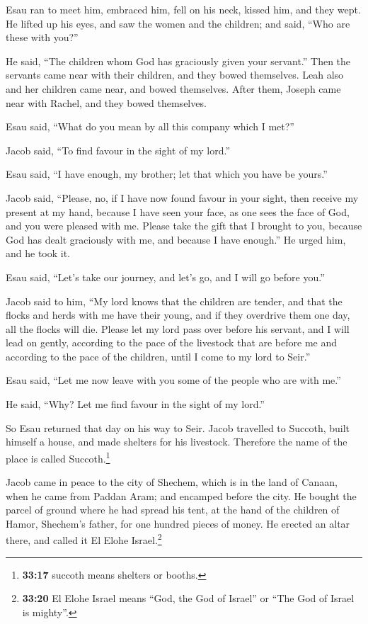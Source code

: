  Esau ran to meet him, embraced him, fell on his neck,
kissed him, and they wept.  He lifted up his eyes, and saw
the women and the children; and said, ``Who are these with you?''

He said, ``The children whom God has graciously given your servant.''
 Then the servants came near with their children, and they
bowed themselves.  Leah also and her children came near,
and bowed themselves. After them, Joseph came near with Rachel, and they
bowed themselves.

 Esau said, ``What do you mean by all this company which I
met?''

Jacob said, ``To find favour in the sight of my lord.''

 Esau said, ``I have enough, my brother; let that which
you have be yours.''

 Jacob said, ``Please, no, if I have now found favour in
your sight, then receive my present at my hand, because I have seen your
face, as one sees the face of God, and you were pleased with me.
 Please take the gift that I brought to you, because God
has dealt graciously with me, and because I have enough.'' He urged him,
and he took it.

 Esau said, ``Let's take our journey, and let's go, and I
will go before you.''

 Jacob said to him, ``My lord knows that the children are
tender, and that the flocks and herds with me have their young, and if
they overdrive them one day, all the flocks will die. 
Please let my lord pass over before his servant, and I will lead on
gently, according to the pace of the livestock that are before me and
according to the pace of the children, until I come to my lord to
Seir.''

 Esau said, ``Let me now leave with you some of the
people who are with me.''

He said, ``Why? Let me find favour in the sight of my lord.''

 So Esau returned that day on his way to Seir.
 Jacob travelled to Succoth, built himself a house, and
made shelters for his livestock. Therefore the name of the place is
called Succoth.\footnote{\textbf{33:17} succoth means shelters or
  booths.}

 Jacob came in peace to the city of Shechem, which is in
the land of Canaan, when he came from Paddan Aram; and encamped before
the city.  He bought the parcel of ground where he had
spread his tent, at the hand of the children of Hamor, Shechem's father,
for one hundred pieces of money.  He erected an altar
there, and called it El Elohe Israel.\footnote{\textbf{33:20} El Elohe
  Israel means ``God, the God of Israel'' or ``The God of Israel is
  mighty''.}

